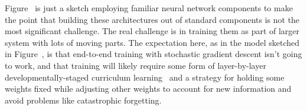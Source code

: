 Figure~{} is just a sketch employing familiar neural network components to make the point that building these architectures out of standard components is not the most significant challenge. The real challenge is in training them as part of larger system with lots of moving parts. The expectation here, as in the model sketched in Figure~{}, is that end-to-end training with stochastic gradient descent isn't going to work, and that training will likely require some form of layer-by-layer developmentally-staged curriculum learning~\cite{LampinenetalCoRR-19,GulcehreetalCoRR-16,BengioetalCoRR-15,BengioetalICML-09} and a strategy for holding some weights fixed while adjusting other weights to account for new information and avoid problems like catastrophic forgetting.

